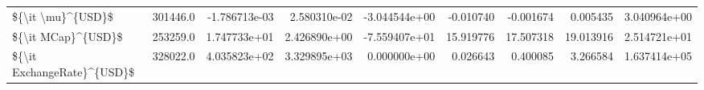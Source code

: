 \begin{tabular}{lrrrrrrrr}
\$\{\textbackslash it \textbackslash mu\}\textasciicircum \{USD\}\$          &  301446.0 &  -1.786713e-03 &  2.580310e-02 & -3.044544e+00 &  -0.010740 &  -0.001674 &   0.005435 &   3.040964e+00 \\
\$\{\textbackslash it MCap\}\textasciicircum \{USD\}\$         &  253259.0 &   1.747733e+01 &  2.426890e+00 & -7.559407e+01 &  15.919776 &  17.507318 &  19.013916 &   2.514721e+01 \\
\$\{\textbackslash it ExchangeRate\}\textasciicircum \{USD\}\$ &  328022.0 &   4.035823e+02 &  3.329895e+03 &  0.000000e+00 &   0.026643 &   0.400085 &   3.266584 &   1.637414e+05 \\
\bottomrule
\end{tabular}
